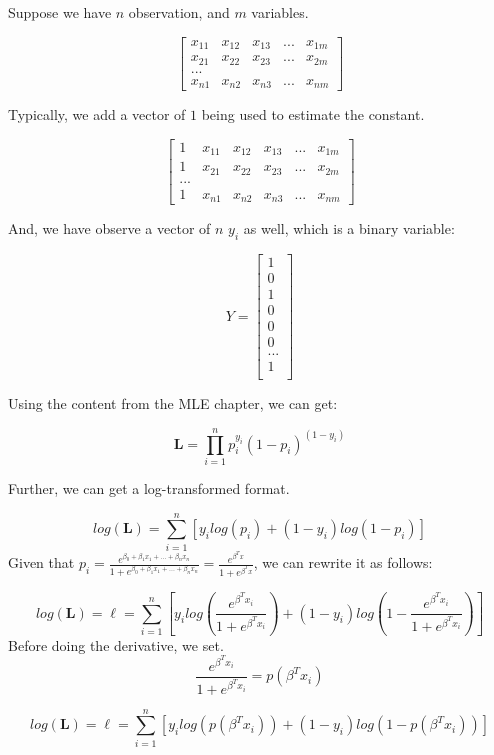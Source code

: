 \documentclass[]{book}
\begin{document}
Suppose we have \(n\) observation, and \(m\) variables.

\[\begin{bmatrix}
x_{11} & x_{12} & x_{13} & ... & x_{1m}\\
x_{21} & x_{22} & x_{23} & ... & x_{2m} \\
...\\
x_{n1} & x_{n2} & x_{n3} & ... & x_{nm}
\end{bmatrix}\]

Typically, we add a vector of \(1\) being used to estimate the constant.

\[\begin{bmatrix}
1 & x_{11} & x_{12} & x_{13} & ... & x_{1m}\\
1 & x_{21} & x_{22} & x_{23} & ... & x_{2m} \\
...\\
1 & x_{n1} & x_{n2} & x_{n3} & ... & x_{nm}
\end{bmatrix}\]

And, we have observe a vector of \(n\) \(y_i\) as well, which is a
binary variable:

\[Y = \begin{bmatrix}1 \\
0 \\
1 \\
0 \\
0 \\
0 \\
...\\
1 \\
\end{bmatrix}\]

Using the content from the MLE chapter, we can get:

\[\mathbf{L}=\prod_{i=1}^{n} p_i^{ y_i}(1-p_i)^{(1-y_i)}\]

Further, we can get a log-transformed format.

\[log (\mathbf{L})=\sum_{i=1}^{n}[y_i log (p_i) + (1-y_i) log(1-p_i)]\]
Given that
\(p_i=\frac{e^{\beta_0+\beta_1x_1+...+\beta_nx_n}}{1+e^{\beta_0+\beta_1x_1+...+\beta_nx_n}}=\frac{e^{\beta^Tx}}{1+e^{\beta^Tx}}\),
we can rewrite it as follows:

\[log (\mathbf{L})=\ell=\sum_{i=1}^{n}[y_i log (\frac{e^{\beta^Tx_i}}{1+e^{\beta^Tx_i}}) + (1-y_i) log(1-\frac{e^{\beta^Tx_i}}{1+e^{\beta^Tx_i}})]\]
Before doing the derivative, we set.
\[\frac{e^{\beta^Tx_i}}{1+e^{\beta^Tx_i}} = p(\beta ^T x_i)\]

\[log (\mathbf{L})=\ell=\sum_{i=1}^{n}[y_i log (p(\beta ^T x_i)) + (1-y_i) log(1-p(\beta ^T x_i))]\]
\end{document}

